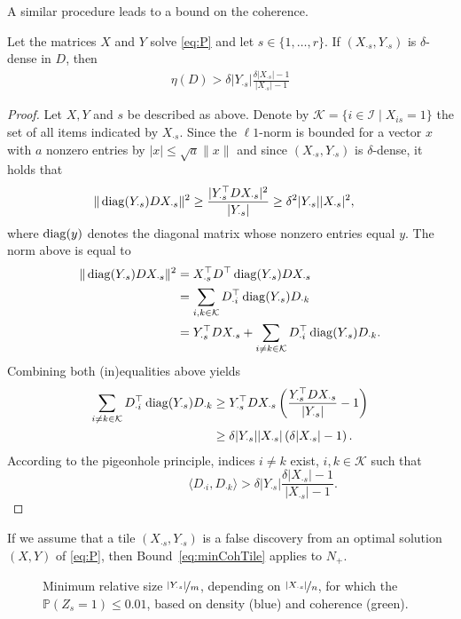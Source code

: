 %
A similar procedure leads to a bound on the coherence.
\begin{lemma} \label{thm:minCohTile}
Let the matrices $X$ and $Y$ solve \eqref{eq:P} and let $s\in\{1,\ldots,r\}$. If $(X_{\cdot s},Y_{\cdot s})$ is $\delta$-dense in $D$, then
\begin{align}
\eta(D) > \delta|Y_{\cdot s}|\frac{\delta|X_{\cdot s}|-1}{|X_{\cdot s}|-1}\label{eq:minCohTile}
\end{align}
\end{lemma}
%
\begin{proof}
Let $X,Y$ and $s$ be described as above. Denote by $\mathcal{K}=\{i\in\mathcal{I}\mid X_{is}=1\}$ the set of all items indicated by $X_{\cdot s}$. Since the $\ell1$-norm is bounded for a vector $x$ with $a$ nonzero entries by $|x|\leq\sqrt{a}\|x\|$ and since $(X_{\cdot s},Y_{\cdot s})$ is $\delta$-dense, it holds that
\begin{align*}
\|\operatorname{diag}(Y_{\cdot s})DX_{\cdot s}\|^2&\geq \frac{|Y_{\cdot s}^\top DX_{\cdot s}|^2}{|Y_{\cdot s}|}\geq \delta^2|Y_{\cdot s}||X_{\cdot s}|^2, 
\end{align*}
where $\operatorname{diag}(y)$ denotes the diagonal matrix whose nonzero entries equal $y$. The norm above is equal to
\begin{align*}
\|\operatorname{diag}(Y_{\cdot s})DX_{\cdot s}\|^2& = X_{\cdot s}^\top D^\top\operatorname{diag}(Y_{\cdot s})DX_{\cdot s}\\
&=\sum_{i,k\in\mathcal{K}} D_{\cdot i}^\top \operatorname{diag}(Y_{\cdot s})D_{\cdot k}\\
&= Y_{\cdot s}^\top DX_{\cdot s}+\sum_{i\neq k\in\mathcal{K}}D_{\cdot i}^\top \operatorname{diag}(Y_{\cdot s})D_{\cdot k}.
\end{align*}
Combining both (in)equalities above yields
\begin{align*}
\sum_{i\neq k\in\mathcal{K}}D_{\cdot i}^\top \operatorname{diag}(Y_{\cdot s})D_{\cdot k}& \geq Y_{\cdot s}^\top DX_{\cdot s}\left(\frac{Y_{\cdot s}^\top DX_{\cdot s}}{|Y_{\cdot s}|}-1\right)\\
&\geq \delta|Y_{\cdot s}||X_{\cdot s}|\left(\delta|X_{\cdot s}|-1\right).
\end{align*}
According to the pigeonhole principle, indices $i\neq k$ exist, $i,k\in\mathcal{K}$ such that
\begin{displaymath}
~\qquad\qquad\quad\langle D_{\cdot i}, D_{\cdot k}\rangle
> \delta|Y_{\cdot s}|\frac{\delta|X_{\cdot s}|-1}{|X_{\cdot s}|-1}.
\end{displaymath}
\end{proof}
%
If we assume that a tile $(X_{\cdot s},Y_{\cdot s})$ is a false discovery from an optimal solution $(X,Y)$ of \eqref{eq:P}, then Bound~\eqref{eq:minCohTile} applies to $N_+$.
\begin{figure}
\centering

\caption{Minimum relative size $\nicefrac{|Y_{\cdot s}|}{m}$, depending on $\nicefrac{|X_{\cdot s}|}{n}$, for which the $\mathbb{P}(Z_s=1)\leq 0.01$, based on density (blue) and coherence (green).}
\label{fig:theory}
\end{figure}

